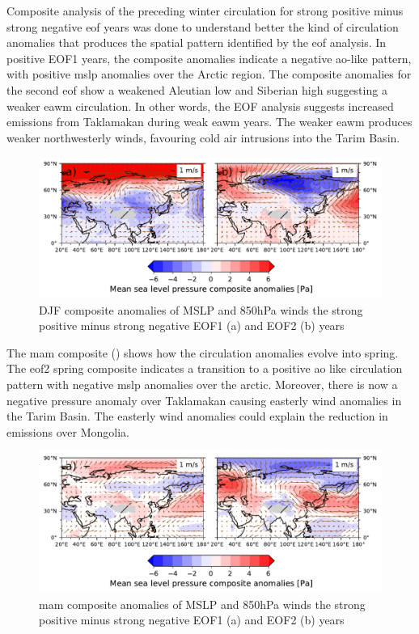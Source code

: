 Composite analysis of the preceding winter circulation for strong positive minus strong negative \acrshort{eof} years was done to understand better the kind of circulation anomalies that produces the spatial pattern identified by the \acrshort{eof} analysis. 
In positive EOF1 years, the composite anomalies indicate a negative \acrshort{ao}-like pattern, with positive \acrshort{mslp} anomalies over the Arctic region.
The composite anomalies for the second \acrshort{eof} show a weakened Aleutian low and Siberian high suggesting a weaker \acrshort{eawm} circulation.
In other words, the EOF analysis suggests increased emissions from Taklamakan during weak \acrshort{eawm} years. 
The weaker \acrshort{eawm} produces weaker northwesterly winds, favouring cold air intrusions into the Tarim Basin.        
\begin{figure}[htpb]
    \centering
    \includegraphics[width=\textwidth]{texfiles/figs/EOF_emissions_composite.pdf}
    \caption{DJF composite anomalies of MSLP and 850hPa winds the strong positive minus strong negative  EOF1 (a) and EOF2 (b) years}
    \label{fig:eof_composite_DJF}
\end{figure}
The \acrshort{mam} composite () shows how the circulation anomalies evolve into spring. 
The \acrshort{eof}2 spring composite indicates a transition to a positive \acrshort{ao} like circulation pattern with negative \acrshort{mslp} anomalies over the arctic. 
Moreover, there is now a negative pressure anomaly over Taklamakan causing easterly wind anomalies in the Tarim Basin.
The easterly wind anomalies could explain the reduction in emissions over Mongolia. 
\begin{figure}[htpb]
    \centering
    \includegraphics[width=\textwidth]{texfiles/figs/EOF_emissions_composite_MAM.pdf}
    \caption{\acrshort{mam} composite anomalies of MSLP and 850hPa winds the strong positive minus strong negative  EOF1 (a) and EOF2 (b) years}
    \label{fig:eof_composite_MAM}
\end{figure}

